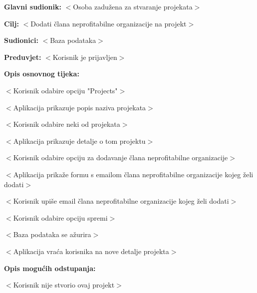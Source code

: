 					\noindent {}
					\begin{packed_item}

						\item \textbf{Glavni sudionik:} $<$Osoba zadužena za stvaranje projekata$>$
						\item \textbf{Cilj:} $<$Dodati člana neprofitabilne organizacije na projekt$>$
						\item \textbf{Sudionici:} $<$Baza podataka$>$
						\item \textbf{Preduvjet:} $<$Korisnik je prijavljen$>$
						\item \textbf{Opis osnovnog tijeka:}

						\item[] \begin{packed_enum}

							\item $<$Korisnik odabire opciju "Projects"$>$
							\item $<$Aplikacija prikazuje popis naziva projekata$>$
							\item $<$Korisnik odabire neki od projekata$>$
							\item $<$Aplikacija prikazuje detalje o tom projektu$>$
							\item $<$Korisnik odabire opciju za dodavanje člana neprofitabilne organizacije$>$
							\item $<$Aplikacija prikaže formu s emailom člana neprofitabilne organizacije kojeg želi dodati$>$
							\item $<$Korisnik upiše email člana neprofitabilne organizacije kojeg želi dodati$>$
							\item $<$Korisnik odabire opciju spremi$>$
							\item $<$Baza podataka se ažurira$>$
							\item $<$Aplikacija vraća korisnika na nove detalje projekta$>$
						\end{packed_enum}

						\item \textbf{Opis mogućih odstupanja:}

						\item[] \begin{packed_item}

							\item[7.a] $<$Korisnik nije stvorio ovaj projekt$>$
							\item[] \begin{packed_enum}


\end{packed_enum}
\end{packed_item}
\end{packed_item}
